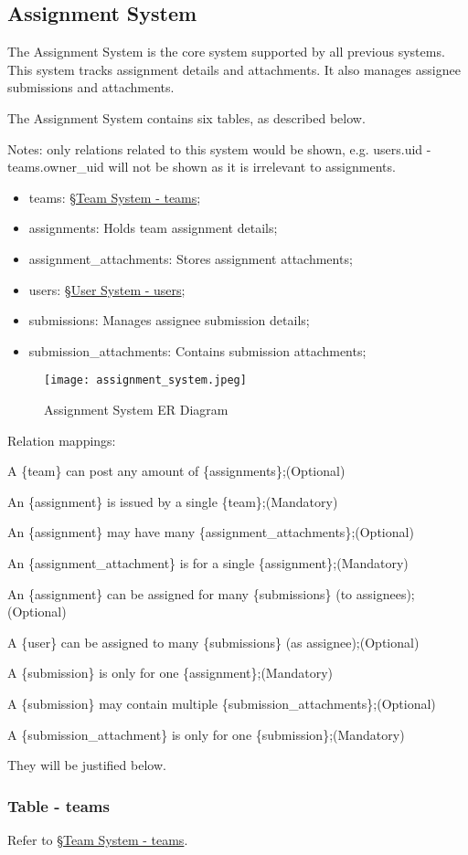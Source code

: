 \documentclass[12pt]{report}
\newcommand{\n}{\par}
\newcommand{\br}{\n\vspace{1 em}\n}
\begin{document}
\subsection{Assignment System} \label{data-layer.design.assignment-system}
The Assignment System is the core system supported by all previous systems.
This system tracks assignment details and attachments.
It also manages assignee submissions and attachments.
\br
The Assignment System contains six tables, as described below.\n
Notes: only relations related to this system would be shown,
e.g. users.uid - teams.owner\_uid will not be shown as it is irrelevant to assignments.
\begin{itemize}
	\item teams: \S \hyperref[data-layer.design.team-system.teams]{Team System - teams};
	\item assignments: Holds team assignment details;
	\item assignment\_attachments: Stores assignment attachments;
	\item users: \S \hyperref[data-layer.design.user-system.users]{User System - users};
	\item submissions: Manages assignee submission details;
	\item submission\_attachments: Contains submission attachments;
\end{itemize}
\br
\begin{figure}[h!]
	\centering
	\texttt{[image: assignment\_system.jpeg]}
	\caption{Assignment System ER Diagram}
	\label{fig:assignment-system-er}
\end{figure}
\br
Relation mappings:\n
A \{team\} can post any amount of \{assignments\};\null\hfill (Optional)\n
An \{assignment\} is issued by a single \{team\};\null\hfill (Mandatory)
\br
An \{assignment\} may have many \{assignment\_attachments\};\null\hfill (Optional)\n
An \{assignment\_attachment\} is for a single \{assignment\};\null\hfill (Mandatory)
\br
An \{assignment\} can be assigned for many \{submissions\} (to assignees);\null\hfill (Optional)\n
A \{user\} can be assigned to many \{submissions\} (as assignee);\null\hfill (Optional)\n
A \{submission\} is only for one \{assignment\};\null\hfill (Mandatory)
\br
A \{submission\} may contain multiple \{submission\_attachments\};\null\hfill (Optional)\n
A \{submission\_attachment\} is only for one \{submission\};\null\hfill (Mandatory)
\br
They will be justified below.

\subsubsection{Table - teams} \label{data-layer.design.assignment-system.teams}
Refer to \S \hyperref[data-layer.design.team-system.teams]{Team System - teams}.
\end{document}
